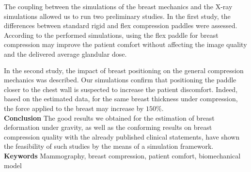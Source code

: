 \noindent
The coupling between the simulations of the breast mechanics and the X-ray simulations allowed us to run two preliminary studies. In the first study, the differences between standard rigid and flex compression paddles were assessed. According to the performed simulations, using the flex paddle for breast compression may improve the patient comfort without affecting the image quality and the delivered average glandular dose. 

\noindent
In the second study, the impact of breast positioning on the general compression mechanics was described. Our simulations confirm that positioning the paddle closer to the chest wall is suspected to increase the patient discomfort. Indeed, based on the estimated data, for the same breast thickness under compression, the force applied to the breast may increase by $150\%$. \\

\noindent
\textbf{Conclusion}
The good results we obtained for the estimation of breast deformation under gravity, as well as the conforming results on breast compression quality with the already published clinical statements, have shown the feasibility of such studies by the means of a simulation framework. \\

\noindent
\textbf{Keywords} Mammography, breast compression, patient comfort, biomechanical model 
